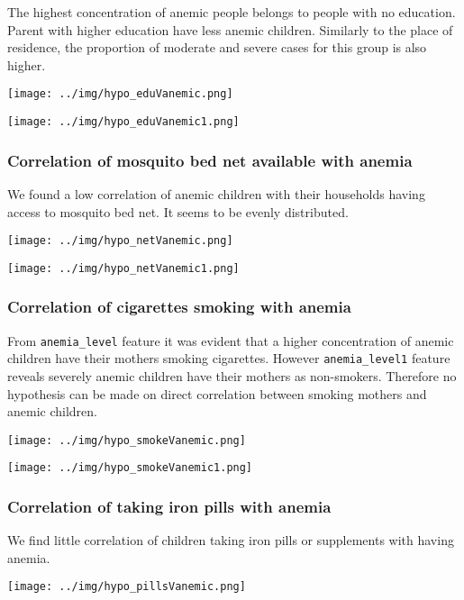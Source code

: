 The highest concentration of anemic people belongs to people with no education. Parent with higher education have less anemic children. Similarly to the place of residence, the proportion of moderate and severe cases for this group is also higher.

\texttt{[image: ../img/hypo\_eduVanemic.png]}

\texttt{[image: ../img/hypo\_eduVanemic1.png]}

\newpage


\subsubsection{Correlation of mosquito bed net available with anemia}


We found a low correlation of anemic children with their households having access to mosquito bed net. It seems to be evenly distributed.

\texttt{[image: ../img/hypo\_netVanemic.png]}

\texttt{[image: ../img/hypo\_netVanemic1.png]}

\newpage


\subsubsection{Correlation of cigarettes smoking with anemia}

From \texttt{anemia\_level} feature it was evident that a higher concentration of anemic children have their mothers smoking cigarettes. However \texttt{anemia\_level1} feature reveals severely anemic children have their mothers as non-smokers. Therefore no hypothesis can be made on direct correlation between smoking mothers and anemic children.

\texttt{[image: ../img/hypo\_smokeVanemic.png]}

\texttt{[image: ../img/hypo\_smokeVanemic1.png]}
\newpage


\subsubsection{Correlation of taking iron pills with anemia}

We find little correlation of children taking iron pills or supplements with having anemia.

\texttt{[image: ../img/hypo\_pillsVanemic.png]}

